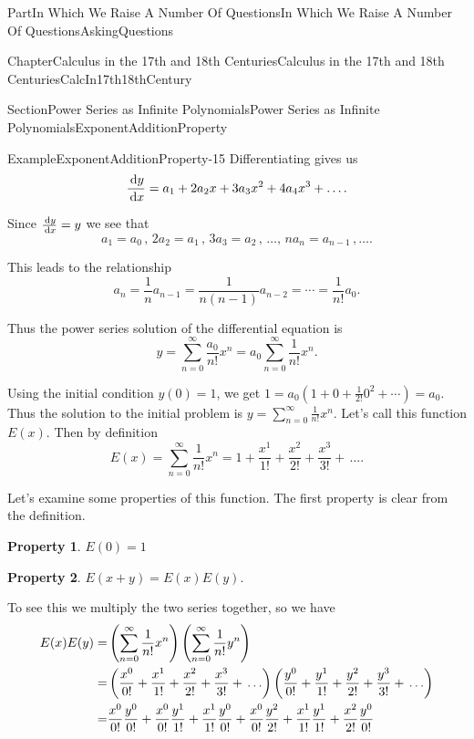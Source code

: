 \documentclass[oneside,10pt,]{book}
\newcommand{\terminology}[1]{\textbf{#1}}
\numberwithin{equation}{part}
\newcommand{\dx}[1]{\,{\rm d}#1}
\newcommand{\amp}{&}
\begin{document}
\begin{partptx}{Part}{In Which We Raise A Number Of Questions}{}{In Which We Raise A Number Of Questions}{}{}{AskingQuestions}
\begin{chapterptx}{Chapter}{Calculus in the 17th and 18th Centuries}{}{Calculus in the 17th and 18th Centuries}{}{}{CalcIn17th18thCentury}
\begin{sectionptx}{Section}{Power Series as Infinite Polynomials}{}{Power Series as Infinite Polynomials}{}{}{ExponentAdditionProperty}
\begin{example}{Example}{}{ExponentAdditionProperty-15}
Differentiating gives us%
\begin{equation*}
\frac{\dx{ y}}{\dx{
x}}=a_1+2a_2x+3a_3x^2+4a_4x^3+\ldots \text{.}
\end{equation*}
%
\par
Since \(\frac{\dx{ y}}{\dx{ x}}=y\) we see that%
\begin{equation*}
a_1=a_0\,,\,2a_2=a_1\,,\,3a_3=a_2\,,\,\ldots,\,na_n=a_{n-1}\,,\ldots\text{.}
\end{equation*}
%
\par
This leads to the relationship%
\begin{equation*}
a_n=\frac{1}{n}a_{n-1}=\frac{1}{n(n-1)}a_{n-2}=\cdots=\frac{1}{n!}a_0\text{.}
\end{equation*}
%
\par
Thus the power series solution of the differential equation is%
\begin{equation*}
y=\sum_{n=0}^\infty\frac{a_0}{n!}x^n
=a_0\sum_{n=0}^\infty\frac{1}{n!}x^n \text{.}
\end{equation*}
%
\par
Using the initial condition \(y(0)=1\), we get \(1=a_0(1+0+\frac{1}{2!}0^2+\cdots)=a_0\).  Thus the solution to the initial problem is \(y=\sum_{n=0}^\infty\frac{1}{n!}x^n\).  Let's call this function \(E(x)\).  Then by definition%
\begin{equation}
E(x)=\sum_{n=0}^\infty\frac{1}{n!}x^n=1+\frac{x^1}{1!}+\frac{x^2}{2!}+\frac{x^3}{3!}+\,\ldots\text{.}\label{EQUATIONExpSeries}
\end{equation}
%
\end{example}
Let's examine some properties of this function.  The first property is clear from the definition.%
\par
\terminology{Property 1}. \(E(0)=1\)%
\par
\terminology{Property 2}. \(E(x+y)=E(x)E(y)\).%
\par
To see this we multiply the two series together, so we have%
\begin{align}
E(x)E(y) =\amp \left(\sum_{n=0}^\infty\frac{1}{n!}x^n\right)\left(\sum_{n=0}^\infty\frac{1}{n!}y^n\right)\label{eq_ExponentAdditionProperty}\\
=\amp \left(\frac{x^0}{0!}+\frac{x^1}{1!}+\frac{x^2}{2!}+\frac{x^3}{3!}+\,\ldots\right)\left(\frac{y^0}{0!}+\frac{y^1}{1!}+\frac{y^2}{2!}+\frac{y^3}{3!}+\,\ldots\right)\notag\\
=\amp \frac{x^0}{0!}\frac{y^0}{0!}+\frac{x^0}{0!}\frac{y^1}{1!}+\frac{x^1}{1!}\frac{y^0}{0!}+\frac{x^0}{0!}\frac{y^2}{2!}+\frac{x^1}{1!}\frac{y^1}{1!}+\frac{x^2}{2!}\frac{y^0}{0!}\notag\\

\end{align}
\end{sectionptx}
\end{chapterptx}
\end{partptx}
\end{document}
